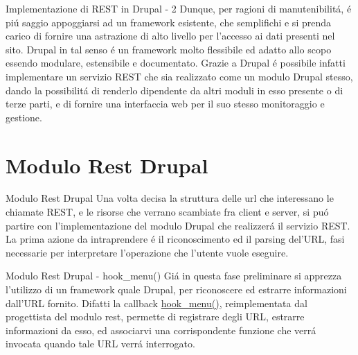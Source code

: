 \documentclass{beamer}
\begin{document}
\begin{frame}{Implementazione di REST in Drupal - 2}
Dunque, per ragioni di manutenibilit\'a, \'e pi\'u saggio appoggiarsi ad un framework esistente, che semplifichi e si prenda carico
di fornire una astrazione di alto livello per l'accesso ai dati presenti nel sito. Drupal in tal senso \'e un framework molto flessibile
ed adatto allo scopo essendo modulare, estensibile e documentato.
\newline
Grazie a Drupal \'e possibile infatti implementare un servizio REST che sia realizzato come un modulo Drupal stesso, dando la
possibilit\'a di renderlo dipendente da altri moduli in esso presente o di terze parti, e di fornire una interfaccia web per il suo
stesso monitoraggio e gestione.
\end{frame}


\section{Modulo Rest Drupal}
\begin{frame}{Modulo Rest Drupal}
Una volta decisa la struttura delle url che interessano le chiamate REST, e le risorse che verrano scambiate fra client e server, si
pu\'o partire con l'implementazione del modulo Drupal che realizzer\'a il servizio REST.
\newline
La prima azione da intraprendere \'e il riconoscimento ed il parsing del'URL, fasi necessarie per interpretare l'operazione che l'utente vuole eseguire.
\end{frame}

\begin{frame}{Modulo Rest Drupal - hook\_menu() }
Gi\'a in questa fase preliminare si apprezza l'utilizzo di un framework quale Drupal, per riconoscere ed estrarre informazioni
dall'URL fornito.
\newline
Difatti la callback  \href{https://api.drupal.org/api/drupal/modules\%21system\%21system.api.php/function/hook\_menu/7}{hook\_menu()}, reimplementata dal progettista del modulo rest,
permette di registrare degli URL, estrarre informazioni da esso, ed associarvi una corrispondente funzione che verr\'a invocata
quando tale URL verr\'a interrogato.
\end{frame}
\end{document}
